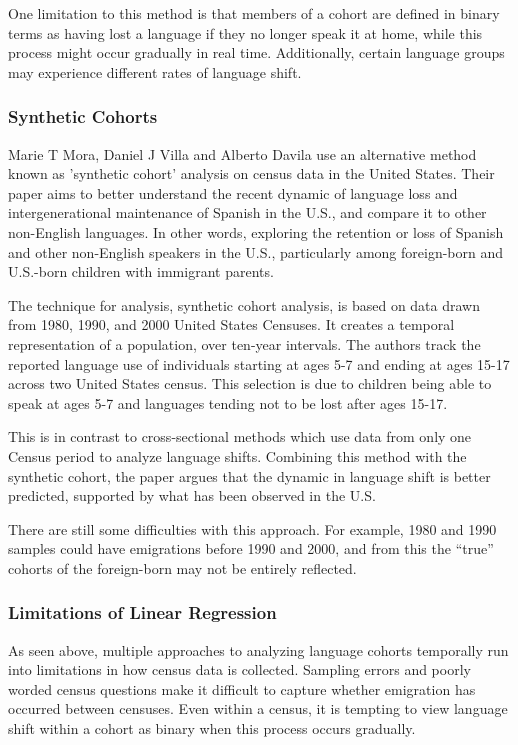 \documentclass[10pt, conference, compsocconf]{IEEEtran}
\begin{document}
One limitation to this method is that members of a cohort are defined in binary terms as having lost a language if they no longer speak it at home, while this process might occur gradually in real time. Additionally, certain language groups may experience different rates of language shift. \cite{dynamics1}

\subsubsection{Synthetic Cohorts}
Marie T Mora, Daniel J Villa and Alberto Davila use an alternative method known as 'synthetic cohort' analysis on census data in the United States. Their paper aims to better understand the recent dynamic of language loss and intergenerational maintenance of Spanish in the U.S., and compare it to other non-English languages. In other words, exploring the retention or loss of Spanish and other non-English speakers in the U.S., particularly among foreign-born and U.S.-born children with immigrant parents. \cite{spanish1}

The technique for analysis, synthetic cohort analysis, is based on data drawn from 1980, 1990, and 2000 United States Censuses. It creates a temporal representation of a population, over ten-year intervals. The authors track the reported language use of individuals starting at ages 5-7 and ending at ages 15-17 across two United States census. This selection is due to children being able to speak at ages 5-7 and languages tending not to be lost after ages 15-17. \cite{spanish1}

This is in contrast to cross-sectional methods which use data from only one Census period to analyze language shifts. Combining this method with the synthetic cohort, the paper argues that the dynamic in language shift is better predicted, supported by what has been observed in the U.S. \cite{spanish1}

There are still some difficulties with this approach. For example, 1980 and 1990 samples could have emigrations before 1990 and 2000, and from this the “true” cohorts of the foreign-born may not be entirely reflected. \cite{spanish1}

\subsubsection{Limitations of Linear Regression}
As seen above, multiple approaches to analyzing language cohorts temporally run into limitations in how census data is collected. Sampling errors and poorly worded census questions make it difficult to capture whether emigration has occurred between censuses. Even within a census, it is tempting to view language shift within a cohort as binary when this process occurs gradually.
\end{document}
